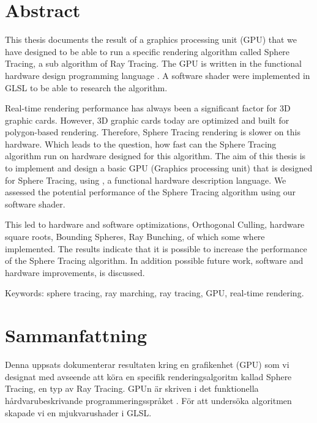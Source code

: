 \thispagestyle{plain}			%
\setlength{\parskip}{10pt}
\setlength{\parindent}{0pt}

\section*{Abstract}

	This thesis documents the result of a graphics processing unit (GPU) that
	we have designed to be able to run a specific rendering algorithm called
	Sphere Tracing, a sub algorithm of Ray Tracing. The GPU is written in the functional
	hardware design programming language \clash. A software shader were implemented 
	in GLSL to be able to research the algorithm.
	
	Real-time rendering performance has always been a significant factor for 3D
	graphic cards. However, 3D graphic cards today are optimized and built for
	polygon-based rendering. Therefore, Sphere Tracing rendering is slower on
	this hardware. Which leads to the question, how fast can the Sphere Tracing 
	algorithm run on hardware designed for this algorithm. The aim of this thesis 
	is to implement and design a basic GPU (Graphics processing unit) that is 
	designed for Sphere Tracing, using \clash,
	a functional hardware description language. We assessed the potential
	performance of the Sphere Tracing algorithm using our software shader.
	
	 
	This led to hardware and software optimizations, Orthogonal Culling, hardware square 
	roots, Bounding Spheres, Ray Bunching, of which some where implemented. 
	The results indicate that it is possible to increase the performance of the 
	Sphere Tracing algorithm. In addition possible future work, software 
	and hardware improvements, is discussed.

	\vfill
	Keywords: sphere tracing, ray marching, ray tracing, GPU, real-time rendering.

\newpage
\thispagestyle{plain}

\section*{Sammanfattning}
	
	Denna uppsats dokumenterar resultaten kring en grafikenhet (GPU) som vi
	designat med avseende att köra en specifik renderingsalgoritm kallad Sphere
	Tracing, en typ av Ray Tracing. GPUn är skriven i det funktionella
	hårdvarubeskrivande programmeringsspråket \clash. För att undersöka algoritmen 
	skapade vi en mjukvarushader i GLSL.
	
